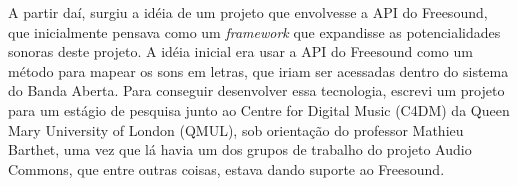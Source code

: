A partir daí, surgiu a idéia de um projeto que envolvesse a API do Freesound, que inicialmente pensava como um \emph{framework} que expandisse as potencialidades sonoras deste projeto. A idéia inicial era usar a API do Freesound como um método para mapear os sons em letras, que iriam ser acessadas dentro do sistema do Banda Aberta. Para conseguir desenvolver essa tecnologia, escrevi um projeto para um estágio de pesquisa junto ao Centre for Digital Music (C4DM) da Queen Mary University of London (QMUL),  sob orientação do professor Mathieu Barthet, uma vez que lá havia um dos grupos de trabalho do projeto Audio Commons, que entre outras coisas, estava dando suporte ao Freesound. 


\newpage






